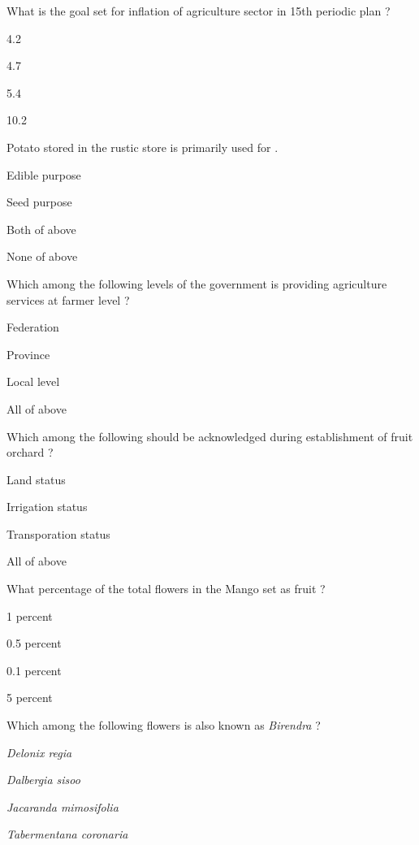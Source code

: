 \begin{questions}
\question What is the goal set for inflation of agriculture sector in 15th periodic plan ?
\begin{items}
\item 4.2
\item 4.7
\item* 5.4
\item 10.2
\end{items}

\question Potato stored in the rustic store is primarily used for \fillin[][3cm].
\begin{items}
\item Edible purpose
\item* Seed purpose
\item Both of above
\item None of above
\end{items}

\question Which among the following levels of the government is providing agriculture services at farmer level ?
\begin{items}
\item Federation
\item Province
\item Local level
\item* All of above
\end{items}

\question Which among the following should be acknowledged during establishment of fruit orchard ?
\begin{items}
\item Land status
\item Irrigation status
\item Transporation status
\item* All of above
\end{items}

\question What percentage of the total flowers in the Mango set as fruit ?
\begin{items}
\item 1 percent
\item 0.5 percent
\item* 0.1 percent
\item 5 percent
\end{items}

\question Which among the following flowers is also known as \textit{Birendra} ?
\begin{items}
\item \textit{Delonix regia}
\item \textit{Dalbergia sisoo}
\item* \textit{Jacaranda mimosifolia}
\item \textit{Tabermentana coronaria}
\end{items}


\end{questions}
